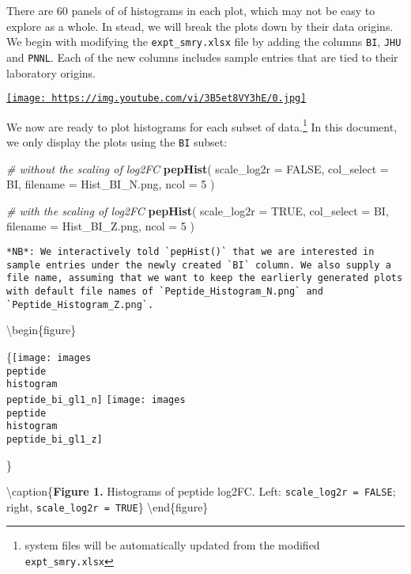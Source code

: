 \documentclass[]{article}
\newenvironment{Shaded}{\begin{snugshade}}{\end{snugshade}}
\newcommand{\CommentTok}[1]{\textcolor[rgb]{0.56,0.35,0.01}{\textit{#1}}}
\newcommand{\DataTypeTok}[1]{\textcolor[rgb]{0.13,0.29,0.53}{#1}}
\newcommand{\DecValTok}[1]{\textcolor[rgb]{0.00,0.00,0.81}{#1}}
\newcommand{\KeywordTok}[1]{\textcolor[rgb]{0.13,0.29,0.53}{\textbf{#1}}}
\newcommand{\NormalTok}[1]{#1}
\newcommand{\OtherTok}[1]{\textcolor[rgb]{0.56,0.35,0.01}{#1}}
\let\rmarkdownfootnote\footnote%
\def\footnote{\protect\rmarkdownfootnote}
\begin{document}
There are 60 panels of of histograms in each plot, which may not be easy
to explore as a whole. In stead, we will break the plots down by their
data origins. We begin with modifying the \texttt{expt\_smry.xlsx} file
by adding the columns \texttt{BI}, \texttt{JHU} and \texttt{PNNL}. Each
of the new columns includes sample entries that are tied to their
laboratory origins.

\href{https://www.youtube.com/embed/3B5et8VY3hE}{\texttt{[image: https://img.youtube.com/vi/3B5et8VY3hE/0.jpg]}}

We now are ready to plot histograms for each subset of data.\footnote{system
  files will be automatically updated from the modified
  \texttt{expt\_smry.xlsx}} In this document, we only display the plots
using the \texttt{BI} subset:

\begin{Shaded}
\begin{Highlighting}[]
\CommentTok{# without the scaling of log2FC }
\KeywordTok{pepHist}\NormalTok{(}
 \DataTypeTok{scale_log2r =} \OtherTok{FALSE}\NormalTok{, }
 \DataTypeTok{col_select =}\NormalTok{ BI,}
 \DataTypeTok{filename =}\NormalTok{ Hist_BI_N.png, }
 \DataTypeTok{ncol =} \DecValTok{5}
\NormalTok{)}

\CommentTok{# with the scaling of log2FC }
\KeywordTok{pepHist}\NormalTok{(}
 \DataTypeTok{scale_log2r =} \OtherTok{TRUE}\NormalTok{, }
 \DataTypeTok{col_select =}\NormalTok{ BI,}
 \DataTypeTok{filename =}\NormalTok{ Hist_BI_Z.png, }
 \DataTypeTok{ncol =} \DecValTok{5}
\NormalTok{)}
\end{Highlighting}
\end{Shaded}

\begin{verbatim}
*NB*: We interactively told `pepHist()` that we are interested in sample entries under the newly created `BI` column. We also supply a file name, assuming that we want to keep the earlierly generated plots with default file names of `Peptide_Histogram_N.png` and `Peptide_Histogram_Z.png`. 
\end{verbatim}

\textbackslash{}begin\{figure\}

\{\centering \texttt{[image: images\\peptide\\histogram\\peptide\_bi\_gl1\_n]}
\texttt{[image: images\\peptide\\histogram\\peptide\_bi\_gl1\_z]}

\}

\textbackslash{}caption\{\textbf{Figure 1.} Histograms of peptide
log2FC. Left: \texttt{scale\_log2r\ =\ FALSE}; right,
\texttt{scale\_log2r\ =\ TRUE}\}\label{fig:Peptide histogram F}
\textbackslash{}end\{figure\}
\end{document}
